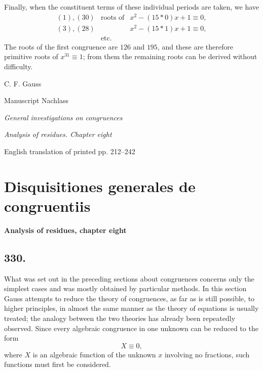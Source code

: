 \documentclass[12pt]{article}
\begin{document}
Finally, when the constituent terms of these individual periods are taken, we have
\[
\begin{array}{rcl}
(1),(30)&\text{roots of}&x^2-(15*0)x+1\equiv 0,\\
(3),(28)&&x^2-(15*1)x+1\equiv 0,\\
&\text{etc.}&
\end{array}
\]
The roots of the first congruence are $126$ and $195$, and these are therefore primitive roots of $x^{31}\equiv 1$; from them the remaining roots can be derived without difficulty.



\clearpage
\begin{center}
{\Large C. F. Gauss}\par
{\large Manuscript Nachlass}\par
{\large \emph{General investigations on congruences}}\par
{\large \emph{Analysis of residues. Chapter eight}}\par
{\large English translation of printed pp. 212--242}
\end{center}

\section*{Disquisitiones generales de congruentiis}

\begin{center}
\textbf{Analysis of residues, chapter eight}
\end{center}

\subsection*{330.}
What was set out in the preceding sections about congruences concerns only the simplest cases and was mostly obtained by particular methods. In this section Gauss attempts to reduce the theory of congruences, as far as is still possible, to higher principles, in almost the same manner as the theory of equations is usually treated; the analogy between the two theories has already been repeatedly observed. Since every algebraic congruence in one unknown can be reduced to the form
\[
X\equiv0,
\]
where $X$ is an algebraic function of the unknown $x$ involving no fractions, such functions must first be considered.
\end{document}
